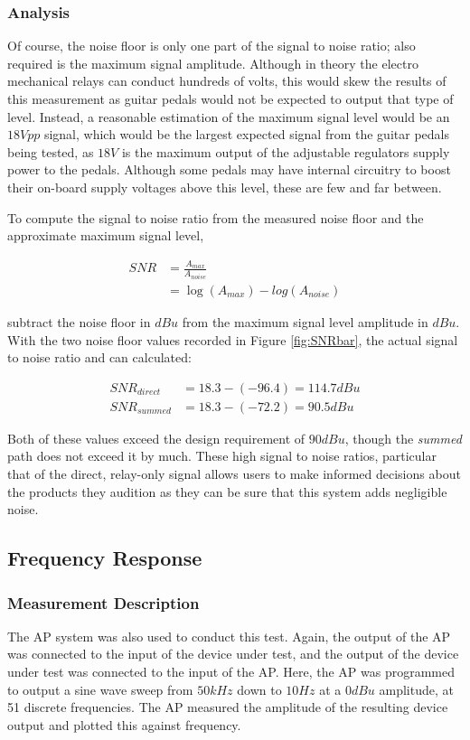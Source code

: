 		\subsubsection{Analysis}

		Of course, the noise floor is only one part of the signal to noise ratio; also required is the maximum signal amplitude.  Although in theory the electro mechanical relays can conduct hundreds of volts, this would skew the results of this measurement as guitar pedals would not be expected to output that type of level.  Instead, a reasonable estimation of the maximum signal level would be an $18Vpp$ signal, which would be the largest expected signal from the guitar pedals being tested, as $18V$ is the maximum output of the adjustable regulators supply power to the pedals.  Although some pedals may have internal circuitry to boost their on-board supply voltages above this level, these are few and far between.

		To compute the signal to noise ratio from the measured noise floor and the approximate maximum signal level,

		\begin{align*}
			SNR &= \frac{A_{max}}{A_{noise}} \\
			&= \log(A_{max}) - log(A_{noise})
		\end{align*}

		subtract the noise floor in $dBu$ from the maximum signal level amplitude in $dBu$.  With the two noise floor values recorded in Figure \ref{fig:SNRbar}, the actual signal to noise ratio and can calculated:

		\begin{align*}
			{SNR}_{direct} &= 18.3 - (-96.4) = 114.7 dBu \\
			{SNR}_{summed} &= 18.3 - (-72.2) = 90.5 dBu
		\end{align*}

		Both of these values exceed the design requirement of $90 dBu$, though the \emph{summed} path does not exceed it by much.  These high signal to noise ratios, particular that of the direct, relay-only signal allows users to make informed decisions about the products they audition as they can be sure that this system adds negligible noise.


	\subsection{Frequency Response}
		\subsubsection{Measurement Description}
		The AP system was also used to conduct this test.  Again, the output of the AP was connected to the input of the device under test, and the output of the device under test was connected to the input of the AP.  Here, the AP was programmed to output a sine wave sweep from $50kHz$ down to $10Hz$ at a $0dBu$ amplitude, at 51 discrete frequencies. The AP measured the amplitude of the resulting device output and plotted this against frequency.

